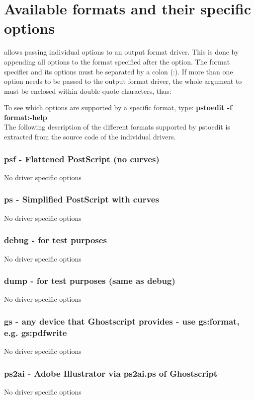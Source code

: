 \documentclass[english,a4paper]{article}
\begin{document}
\section{Available formats and their specific options}

 allows passing individual options to an output format driver. This is done by
appending all options to the format specified after the  option. The format
specifier and its options must be separated by a colon (:). If more than one
option needs to be passed to the output format driver, the whole argument to  must be
enclosed within double-quote characters, thus:


To see which options are supported by a specific format, type:
     \textbf{pstoedit -f format:-help}
     \\

The following description of the different formats supported by pstoedit is extracted from the source code of the individual drivers.

\subsubsection{psf - Flattened PostScript (no curves)}
No driver specific options
\subsubsection{ps - Simplified PostScript with curves}
No driver specific options
\subsubsection{debug - for test purposes}
No driver specific options
\subsubsection{dump - for test purposes (same as debug)}
No driver specific options
\subsubsection{gs - any device that Ghostscript provides - use gs:format, e.g. gs:pdfwrite}
No driver specific options
\subsubsection{ps2ai - Adobe Illustrator via ps2ai.ps of Ghostscript}
No driver specific options
\end{document}
